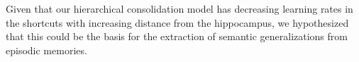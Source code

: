%
Given that our hierarchical consolidation model has decreasing learning rates in the shortcuts with increasing distance from the hippocampus, we hypothesized that this could be the basis for the extraction of semantic generalizations from episodic memories.
%
%
%
